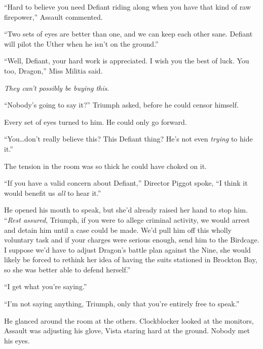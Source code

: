 ``Hard to believe you need Defiant riding along when you have that kind of raw firepower,'' Assault commented.



``Two sets of eyes are better than one, and we can keep each other sane.  Defiant will pilot the Uther when he isn't on the ground.''



``Well, Defiant, your hard work is appreciated.  I wish you the best of luck.  You too, Dragon,'' Miss Militia said.



\emph{They can't possibly be buying this}.



``Nobody's going to say it?''  Triumph asked, before he could censor himself.



Every set of eyes turned to him.  He could only go forward.



``You\ldots don't really believe this?  This Defiant thing?  He's not even \emph{trying} to hide it.''



The tension in the room was so thick he could have choked on it.



``If you have a valid concern about Defiant,'' Director Piggot spoke, ``I think it would benefit us \emph{all} to hear it.''



He opened his mouth to speak, but she'd already raised her hand to stop him.  ``\emph{Rest assured}, Triumph, if you were to allege criminal activity, we would arrest and detain him until a case could be made.  We'd pull him off this wholly voluntary task and if your charges were serious enough, send him to the Birdcage.  I suppose we'd have to adjust Dragon's battle plan against the Nine, she would likely be forced to rethink her idea of having the suits stationed in Brockton Bay, so she was better able to defend herself.''



``I get what you're saying.''



``I'm not saying anything, Triumph, only that you're entirely free to speak.''



He glanced around the room at the others.  Clockblocker looked at the monitors, Assault was adjusting his glove, Vista staring hard at the ground.  Nobody met his eyes.



